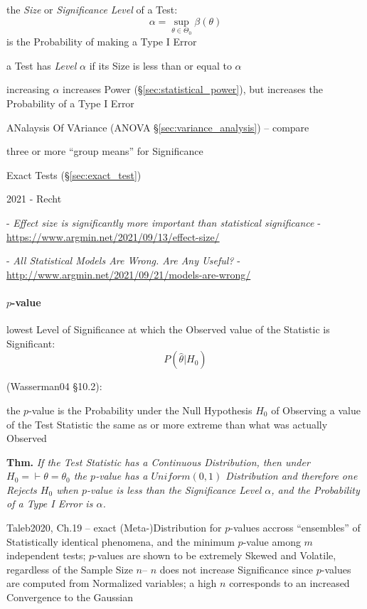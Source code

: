 the \emph{Size} or \emph{Significance Level} of a Test:
\[
  \alpha = \sup_{\theta \in \Theta_0} \beta(\theta)
\]
is the Probability of making a Type I Error

a Test has \emph{Level} $\alpha$ if its Size is less than or equal to $\alpha$

increasing $\alpha$ increases Power (\S\ref{sec:statistical_power}), but
increases the Probability of a Type I Error

\fist ANalaysis Of VAriance (ANOVA \S\ref{sec:variance_analysis}) -- compare

three or more ``group means'' for Significance

Exact Tests (\S\ref{sec:exact_test})

2021 - Recht

- \emph{Effect size is significantly more important than statistical
significance} - \url{https://www.argmin.net/2021/09/13/effect-size/}

- \emph{All Statistical Models Are Wrong. Are Any Useful?} -
\url{http://www.argmin.net/2021/09/21/models-are-wrong/}



\paragraph{$p$-value}\label{sec:p_value}\hfill

lowest Level of Significance at which the Observed value of the Statistic is
Significant:
\[
  P(\hat{\theta} | H_0)
\]

(Wasserman04 \S10.2):

the $p$-value is the Probability under the Null Hypothesis $H_0$ of Observing a
value of the Test Statistic the same as or more extreme than what was actually
Observed

\textbf{Thm.} \emph{
  If the Test Statistic has a Continuous Distribution, then under
  $H_0 = \vdash \theta = \theta_0$ the $p$-value has a $Uniform(0,1)$
  Distribution and therefore one Rejects $H_0$ when $p$-value is less than the
  Significance Level $\alpha$, and the Probability of a Type I Error is
  $\alpha$.
}

Taleb2020, Ch.19 -- exact (Meta-)Distribution for $p$-values accross
``ensembles'' of Statistically identical phenomena, and the minimum $p$-value
among $m$ independent tests; $p$-values are shown to be extremely Skewed and
Volatile, regardless of the Sample Size $n$-- $n$ does not increase Significance
since $p$-values are computed from Normalized variables; a high $n$ corresponds
to an increased Convergence to the Gaussian



